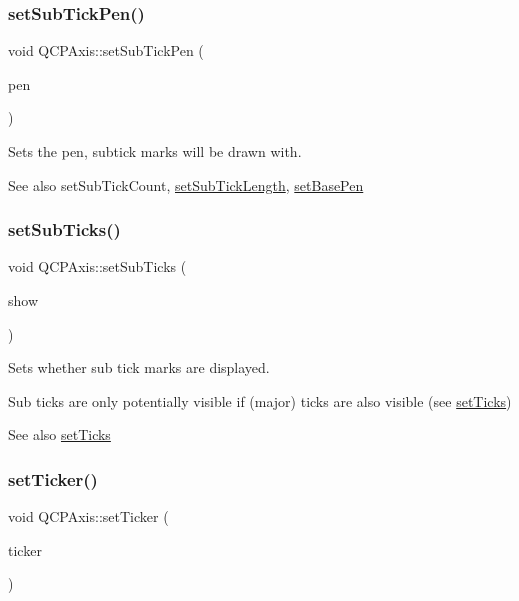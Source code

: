 \subsubsection{\texorpdfstring{set\+Sub\+Tick\+Pen()}{setSubTickPen()}}
{\footnotesize\ttfamily void Q\+C\+P\+Axis\+::set\+Sub\+Tick\+Pen (\begin{DoxyParamCaption}\item[{const Q\+Pen \&}]{pen }\end{DoxyParamCaption})}

Sets the pen, subtick marks will be drawn with.

\begin{DoxySeeAlso}{See also}
set\+Sub\+Tick\+Count, \hyperlink{class_q_c_p_axis_ab702d6fd42fc620607435339a1c2a2e1}{set\+Sub\+Tick\+Length}, \hyperlink{class_q_c_p_axis_a778d45fb71b3c7ab3bb7079e18b058e4}{set\+Base\+Pen} 
\end{DoxySeeAlso}
\mbox{\label{class_q_c_p_axis_afa0ce8d4d0015ed23dcde01f8bc30106}} 
\subsubsection{\texorpdfstring{set\+Sub\+Ticks()}{setSubTicks()}}
{\footnotesize\ttfamily void Q\+C\+P\+Axis\+::set\+Sub\+Ticks (\begin{DoxyParamCaption}\item[{bool}]{show }\end{DoxyParamCaption})}

Sets whether sub tick marks are displayed.

Sub ticks are only potentially visible if (major) ticks are also visible (see \hyperlink{class_q_c_p_axis_ac891409315bc379e3b1abdb162c1a011}{set\+Ticks})

\begin{DoxySeeAlso}{See also}
\hyperlink{class_q_c_p_axis_ac891409315bc379e3b1abdb162c1a011}{set\+Ticks} 
\end{DoxySeeAlso}
\mbox{\label{class_q_c_p_axis_a4ee03fcd2c74d05cd1a419b9af5cfbdc}} 
\subsubsection{\texorpdfstring{set\+Ticker()}{setTicker()}}
{\footnotesize\ttfamily void Q\+C\+P\+Axis\+::set\+Ticker (\begin{DoxyParamCaption}\item[{Q\+Shared\+Pointer$<$ \hyperlink{class_q_c_p_axis_ticker}{Q\+C\+P\+Axis\+Ticker} $>$}]{ticker }\end{DoxyParamCaption})}

